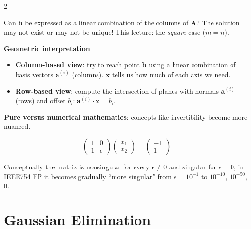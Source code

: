 \documentclass[a4paper,9pt]{extarticle}
\begin{document}
\begin{multicols}{2}
\begin{definition}
Can $\mathbf{b}$ be expressed as a linear combination of the columns of $\mathbf{A}$? The
solution may not exist or may not be unique! This lecture: the \emph{square} case ($m = n$).

\end{definition}


\begin{important}

\textbf{Geometric interpretation}

\begin{itemize}

\item \textbf{Column-based view}: try to reach point $\mathbf{b}$ using a linear combination of
basis vectors $\mathbf{a}^{(i)}$ (columns). $\mathbf{x}$ tells us how much of each axis we need.

\item \textbf{Row-based view}: compute the intersection of planes with normals $\mathbf{a}^{(i)}$
(rows) and offset $b_i$: $\mathbf{a}^{(i)} \cdot \mathbf{x} = b_i$.

\end{itemize}

\end{important}


\begin{warning}

\textbf{Pure versus numerical mathematics}: concepts like invertibility become more nuanced.

\[
\begin{pmatrix} 1 & 0 \\ 1 & \epsilon \end{pmatrix}
\begin{pmatrix} x_1 \\ x_2 \end{pmatrix}
= \begin{pmatrix} -1 \\ 1 \end{pmatrix}
\]

Conceptually the matrix is nonsingular for every $\epsilon \ne 0$ and singular for
$\epsilon = 0$; in IEEE754 FP it becomes gradually ``more singular'' from
$\epsilon = 10^{-1}$ to $10^{-10}$, $10^{-50}$, $0$.

\end{warning}



\section{Gaussian Elimination}



\end{multicols}
\end{document}
